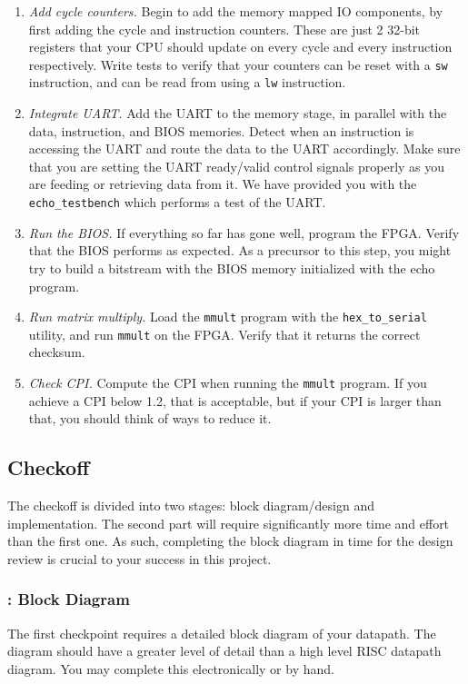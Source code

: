 \documentclass[11pt]{article}
\begin{document}
\begin{enumerate}
  \item \textit{Add cycle counters.} Begin to add the memory mapped IO components, by first adding the cycle and instruction counters. These are just 2 32-bit registers that your CPU should update on every cycle and every instruction respectively. Write tests to verify that your counters can be reset with a \verb|sw| instruction, and can be read from using a \verb|lw| instruction.
  \item \textit{Integrate UART.} Add the UART to the memory stage, in parallel with the data, instruction, and BIOS memories. Detect when an instruction is accessing the UART and route the data to the UART accordingly. Make sure that you are setting the UART ready/valid control signals properly as you are feeding or retrieving data from it. We have provided you with the \verb|echo_testbench| which performs a test of the UART.
  \item \textit{Run the BIOS.} If everything so far has gone well, program the FPGA. Verify that the BIOS performs as expected. As a precursor to this step, you might try to build a bitstream with the BIOS memory initialized with the echo program.
  \item \textit{Run matrix multiply.} Load the \verb|mmult| program with the \verb|hex_to_serial| utility, and run \verb|mmult| on the FPGA. Verify that it returns the correct checksum.
  \item \textit{Check CPI.} Compute the CPI when running the \verb|mmult| program. If you achieve a CPI below 1.2, that is acceptable, but if your CPI is larger than that, you should think of ways to reduce it.
\end{enumerate}

\subsection{Checkoff}
The checkoff is divided into two stages: block diagram/design and implementation.
The second part will require significantly more time and effort than the first one.
As such, completing the block diagram in time for the design review is crucial to your success in this project.

\subsubsection{\blockDiagramTaskName: Block Diagram}
The first checkpoint requires a detailed block diagram of your datapath.
The diagram should have a greater level of detail than a high level RISC datapath diagram.
You may complete this electronically or by hand.
\end{document}
